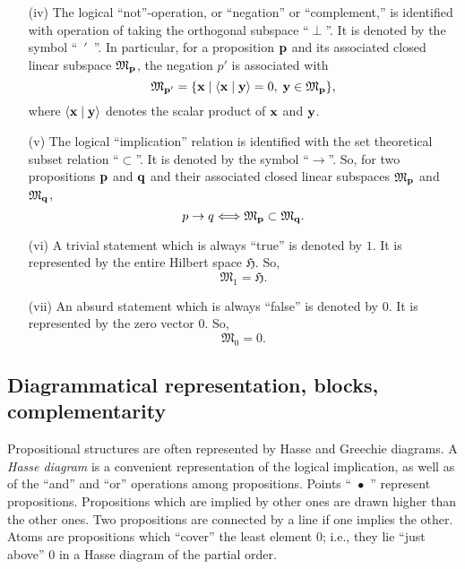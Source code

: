 {\begin{itemize}
Notice that
a vector of Hilbert space may be an element of
$
{\mathfrak M}_{{{\bf p}}} \oplus
{\mathfrak M}_{{{\bf q}}}
$
without being an element of either
$
{\mathfrak M}_{{{\bf p}}} $ or
${\mathfrak M}_{{{\bf q}}}
$, since
$
{\mathfrak M}_{{{\bf p}}} \oplus
{\mathfrak M}_{{{\bf q}}}
$
includes all the vectors in
$
{\mathfrak M}_{{{\bf p}}} \cup
{\mathfrak M}_{{{\bf q}}}
$, as well as all of their linear combinations (superpositions) and
their limit vectors.


\item[(iv)]
The logical {``not''}-operation, or ``negation'' or ``complement,''
is
identified with operation of taking the orthogonal subspace ``$\perp$''.
It is denoted by the symbol ``~$'$~''.
In particular, for a
proposition ${{\bf p}}$ and its associated closed linear
subspace
${\mathfrak M}_{{\bf p}}$, the negation $p'$ is associated with
$$
{\mathfrak M}_{{{\bf p}}'} =
 \{{{\bf x}} \mid \langle {{\bf x}}\mid {{\bf y}}\rangle =0,\; {{\bf y}}\in
{\mathfrak M}_{{\bf p}}
\} ,$$
where $\langle {{\bf x}}\mid {{\bf y}}\rangle$ denotes the scalar product of ${{\bf x}}$ and ${{\bf y}}$.

\item[(v)]
The logical {``implication''} relation is identified with the set
theoretical subset relation ``$\subset$''.
It is denoted by the symbol ``$\rightarrow$''.
So, for two
propositions ${{\bf p}}$ and ${{\bf q}}$ and their associated closed linear
subspaces
${\mathfrak M}_{{\bf p}}$ and
${\mathfrak M}_{{\bf q}}$,
$$
{p\rightarrow q} \Longleftrightarrow
{\mathfrak M}_{{{\bf p}}} \subset
{\mathfrak M}_{{{\bf q}}}.$$

\item[(vi)]
A trivial statement which is always {``true''} is denoted by $1$.
It is represented by the entire Hilbert space $\mathfrak H$.
So, $${\mathfrak M}_1={\mathfrak H}.$$

\item[(vii)]
An absurd statement which is always {``false''} is denoted by $0$.
It is represented by the zero vector $0$.
So, $${\mathfrak M}_0= 0.$$
\end{itemize}



\subsection{Diagrammatical representation, blocks, complementarity}

Propositional structures are often represented by
Hasse and Greechie diagrams.
A {\em Hasse diagram} is a convenient representation of the
logical implication,
as well as of the {``and''} and {``or''}
operations
among propositions.
 Points
``~$\bullet$~'' represent propositions. Propositions
which are implied by other ones are drawn higher than the other ones.
Two propositions are connected by a line if one implies the other.
Atoms are propositions which ``cover'' the least element $0$; i.e.,
they lie ``just above'' $0$ in a Hasse diagram of the partial order.



}
